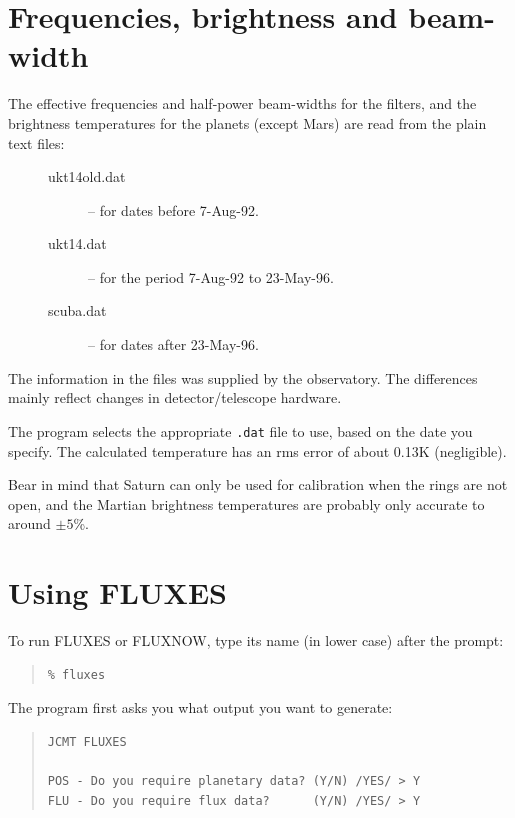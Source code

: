 \documentclass[11pt,twoside]{article}
\newenvironment{myquote}{\begin{quote}\begin{small}}{\end{small}\end{quote}}
\newcommand{\xlabel}[1]{}
\renewcommand{\_}{\texttt{\symbol{95}}}
\begin{document}
\section{Frequencies, brightness and beam-width}
\xlabel{FREQ}
\label{sec:freq}

The effective frequencies and half-power beam-widths for the filters, and the
brightness temperatures for the planets (except Mars) are read from the plain
text files:

\begin{description}
\item[\mbox{}]\mbox{}
\begin{description}
\item [ukt14\_old.dat] -- for dates before 7-Aug-92.
\item [ukt14.dat] -- for the period 7-Aug-92 to 23-May-96.
\item [scuba.dat] -- for dates after 23-May-96.
\end{description}
\end{description}

The information in the files was supplied by the observatory.
The differences mainly reflect changes in detector/telescope hardware.

The program selects the appropriate {\tt{.dat}} file to use, based on the date
you specify.
The calculated temperature has an rms error of about 0.13K (negligible). 

Bear in mind that Saturn can only be used for calibration when the
rings are not open, and the Martian brightness temperatures are probably 
only accurate to around $\pm5$\%. 

\section{Using FLUXES}
\xlabel{USING}
\label{sec:using}
 
To run FLUXES or FLUXNOW, type its name (in lower case) after the prompt:

\begin{myquote}
\begin{verbatim}
% fluxes
\end{verbatim}
\end{myquote}

The program first asks you what output you want to generate:

\begin{myquote}
\begin{verbatim}
JCMT FLUXES
 
POS - Do you require planetary data? (Y/N) /YES/ > Y
FLU - Do you require flux data?      (Y/N) /YES/ > Y
\end{verbatim} 
\end{myquote}
\end{document}
